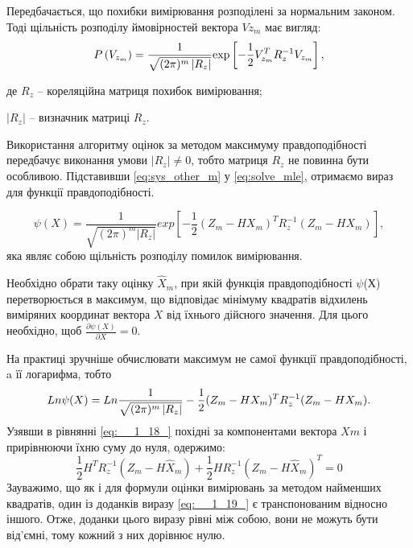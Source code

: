 Передбачається, що похибки вимірювання розподілені за нормальним законом. Тоді щільність 
розподілу ймовірностей вектора  $Vz_m$ має вигляд:
\begin{equation}
P\left(V_{z_{m} } \right)=\frac{1}{\sqrt{(2\pi)^{m} \left|R_{z} \right|} 
} {\rm exp}\left[-\frac{1}{2} V_{z_{m} }^{T} R_{z}^{-1} V_{z_{m} } \right],                       
\label{eq:solve_mle}
\end{equation}
\begin{ESKDexplanation}
\item де $R_z$ -- кореляційна матриця похибок вимірювання; 
\item $|R_z|$ -- визначник матриці $R_z$.                                                   
\end{ESKDexplanation}
Використання алгоритму оцінок за методом максимуму правдоподібності передбачує виконання умови 
$|R_z|\neq 0$, тобто матриця $R_z$ не повинна бути 
особливою. Підставивши \eqref{eq:sys_other_m} у \eqref{eq:solve_mle}, отримаємо 
вираз для функції правдоподібності.

\[\psi (X)=\frac{1}{\sqrt{(2\pi )^{m} \left|R_{z} \right|} } exp \left[-\frac{1}{2} 
(Z_{m} -HX_{m} )^{T} R_{z}^{-1} (Z_{m} -HX_{m} )\right],\] 
яка являє собою щільність розподілу помилок  вимірювання.

Необхідно обрати таку оцінку  $\hat{X}_{m}$, при якій функція 
правдоподібності $ \psi$(Х) перетворюється в максимум, що відповідає 
мінімуму квадратів відхилень виміряних координат вектора $X$ від їхнього дійсного значення. 
Для цього необхідно, щоб $\frac{\partial \psi (X)}{\partial X} =0$.

На практиці зручніше обчислювати максимум не самої функції правдоподібності, a її 
логарифма, тобто 
\begin{equation}
Ln \psi (X)= Ln\frac{1}{\sqrt{(2{\rm 
\pi })^{m} \left|R_{z} \right|} } -\frac{1}{2} (Z_{m} -HX_{m} )^{T} R_{z}^{-1} 
(Z_{m} -HX_{m} ).       
\label{eq:__1_18_}
\end{equation}
Узявши в рівнянні \eqref{eq:__1_18_} похідні за компонентами вектора $Xm$ 
і прирівнюючи їхню суму до нуля, одержимо:
\begin{equation}
\frac{1}{2} H^{T} R_{z}^{-1} (Z_{m} -H\hat{X}_{m} )+\frac{1}{2} 
HR_{z}^{-1} (Z_{m} -H\hat{X}_{m} )^{T} =0              
\label{eq:__1_19_}
\end{equation}
Зауважимо, що як і для формули оцінки вимірювань за методом найменших квадратів, один із доданків 
виразу \eqref{eq:__1_19_} є транспонованим відносно іншого. Отже, доданки цього 
виразу рівні між собою, вони не можуть бути від'ємні, тому кожний з них дорівнює 
нулю. 

